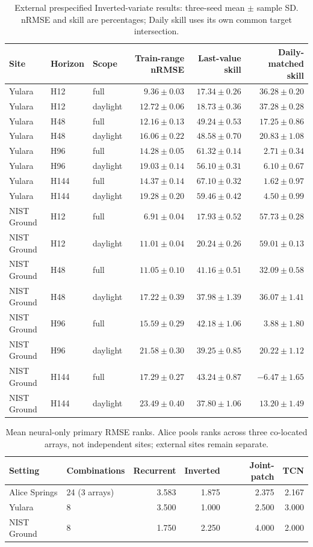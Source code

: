 \begin{table}[!tp]
\centering\small
\caption{External prespecified Inverted-variate results: three-seed mean $\pm$ sample SD. nRMSE and skill are percentages; Daily skill uses its own common target intersection.}
\label{tab:external}
\begin{tabular}{lllrrr}
\toprule Site & Horizon & Scope & Train-range nRMSE & Last-value skill & Daily-matched skill\\\midrule
Yulara & H12 & full & $9.36\pm0.03$ & $17.34\pm0.26$ & $36.28\pm0.20$\\
Yulara & H12 & daylight & $12.72\pm0.06$ & $18.73\pm0.36$ & $37.28\pm0.28$\\
Yulara & H48 & full & $12.16\pm0.13$ & $49.24\pm0.53$ & $17.25\pm0.86$\\
Yulara & H48 & daylight & $16.06\pm0.22$ & $48.58\pm0.70$ & $20.83\pm1.08$\\
Yulara & H96 & full & $14.28\pm0.05$ & $61.32\pm0.14$ & $2.71\pm0.34$\\
Yulara & H96 & daylight & $19.03\pm0.14$ & $56.10\pm0.31$ & $6.10\pm0.67$\\
Yulara & H144 & full & $14.37\pm0.14$ & $67.10\pm0.32$ & $1.62\pm0.97$\\
Yulara & H144 & daylight & $19.28\pm0.20$ & $59.46\pm0.42$ & $4.50\pm0.99$\\
NIST Ground & H12 & full & $6.91\pm0.04$ & $17.93\pm0.52$ & $57.73\pm0.28$\\
NIST Ground & H12 & daylight & $11.01\pm0.04$ & $20.24\pm0.26$ & $59.01\pm0.13$\\
NIST Ground & H48 & full & $11.05\pm0.10$ & $41.16\pm0.51$ & $32.09\pm0.58$\\
NIST Ground & H48 & daylight & $17.22\pm0.39$ & $37.98\pm1.39$ & $36.07\pm1.41$\\
NIST Ground & H96 & full & $15.59\pm0.29$ & $42.18\pm1.06$ & $3.88\pm1.80$\\
NIST Ground & H96 & daylight & $21.58\pm0.30$ & $39.25\pm0.85$ & $20.22\pm1.12$\\
NIST Ground & H144 & full & $17.29\pm0.27$ & $43.24\pm0.87$ & $-6.47\pm1.65$\\
NIST Ground & H144 & daylight & $23.49\pm0.40$ & $37.80\pm1.06$ & $13.20\pm1.49$\\
\bottomrule\end{tabular}
\end{table}
\begin{table}[!tp]
\centering\small
\caption{Mean neural-only primary RMSE ranks. Alice pools ranks across three co-located arrays, not independent sites; external sites remain separate.}
\label{tab:ranks}
\begin{tabular}{llrrrr}
\toprule Setting & Combinations & Recurrent & Inverted & Joint-patch & TCN\\\midrule
Alice Springs & 24 (3 arrays) & 3.583 & 1.875 & 2.375 & 2.167\\
Yulara & 8 & 3.500 & 1.000 & 2.500 & 3.000\\
NIST Ground & 8 & 1.750 & 2.250 & 4.000 & 2.000\\
\bottomrule\end{tabular}
\end{table}
